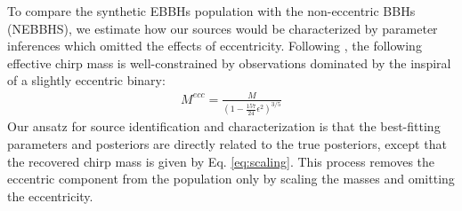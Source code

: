 \documentclass[twocolumn,prd,nofootinbib]{revtex4}
\begin{document}
To compare the synthetic EBBHs population with the non-eccentric BBHs (NEBBHS), we estimate how our sources would be characterized by parameter inferences which omitted the effects of eccentricity.  Following \cite{2021_scaling_paper}, the following effective chirp mass is well-constrained by observations dominated by the inspiral of a slightly eccentric binary:
\begin{align}
\label{eq:scaling}
M^{ecc} = \frac{M}{(1-\frac{157}{24}\epsilon^2)^{3/5}}
\end{align}
%
Our ansatz for source identification and characterization is that the best-fitting parameters and posteriors are directly related to the true posteriors, except that the recovered chirp mass is given by  Eq. \ref{eq:scaling}.  This process removes the eccentric component from the population only by scaling the masses and omitting the eccentricity. 





    \label{tab:popscl_prop}
 
\end{document}
